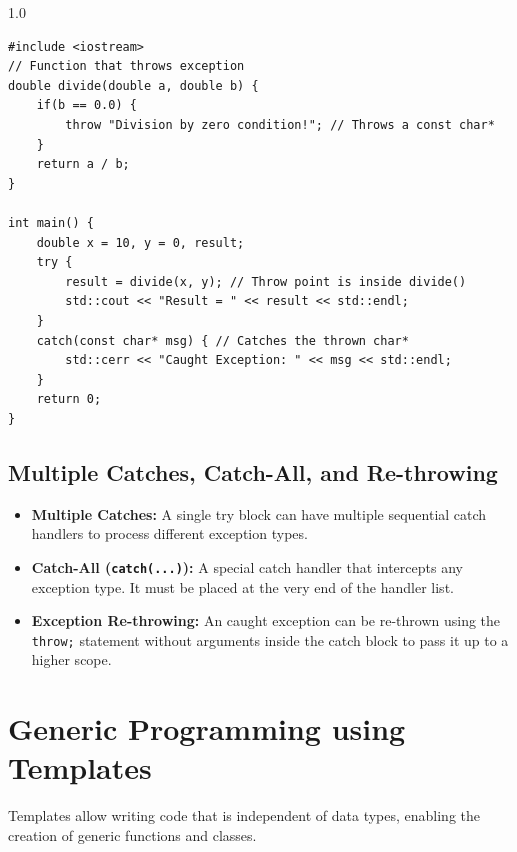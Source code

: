 \documentclass[12pt,a4paper]{article}
\begin{document}
\begin{tcolorbox}[examplebox, title={Code Example: Exception throw point outside the main try block}]
\begin{spacing}{1.0}
\begin{verbatim}
#include <iostream>
// Function that throws exception
double divide(double a, double b) {
    if(b == 0.0) {
        throw "Division by zero condition!"; // Throws a const char*
    }
    return a / b;
}

int main() {
    double x = 10, y = 0, result;
    try {
        result = divide(x, y); // Throw point is inside divide()
        std::cout << "Result = " << result << std::endl;
    }
    catch(const char* msg) { // Catches the thrown char*
        std::cerr << "Caught Exception: " << msg << std::endl;
    }
    return 0;
}
\end{verbatim}
\end{spacing}
\end{tcolorbox}

\subsection{Multiple Catches, Catch-All, and Re-throwing}
\begin{itemize}[leftmargin=*, itemsep=3pt]
  \item \textbf{Multiple Catches:} A single try block can have multiple sequential catch handlers to process different exception types.
  \item \textbf{Catch-All (\texttt{catch(...)}):} A special catch handler that intercepts any exception type. It must be placed at the very end of the handler list.
  \item \textbf{Exception Re-throwing:} An caught exception can be re-thrown using the \texttt{throw;} statement without arguments inside the catch block to pass it up to a higher scope.
\end{itemize}

\section{Generic Programming using Templates}

Templates allow writing code that is independent of data types, enabling the creation of generic functions and classes.
\end{document}
